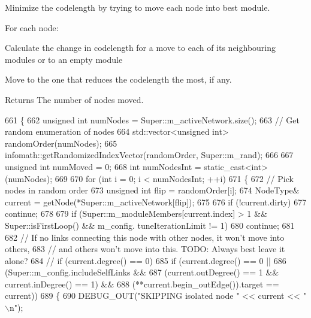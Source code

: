 Minimize the codelength by trying to move each node into best module.

For each node\+:
\begin{DoxyEnumerate}
\item Calculate the change in codelength for a move to each of its neighbouring modules or to an empty module
\item Move to the one that reduces the codelength the most, if any.
\end{DoxyEnumerate}

\begin{DoxyReturn}{Returns}
The number of nodes moved. 
\end{DoxyReturn}

\begin{DoxyCode}
661 \{
662     \textcolor{keywordtype}{unsigned} \textcolor{keywordtype}{int} numNodes = Super::m\_activeNetwork.size();
663     \textcolor{comment}{// Get random enumeration of nodes}
664     std::vector<unsigned int> randomOrder(numNodes);
665     infomath::getRandomizedIndexVector(randomOrder, Super::m\_rand);
666 
667     \textcolor{keywordtype}{unsigned} \textcolor{keywordtype}{int} numMoved = 0;
668     \textcolor{keywordtype}{int} numNodesInt = \textcolor{keyword}{static\_cast<}\textcolor{keywordtype}{int}\textcolor{keyword}{>}(numNodes);
669 
670     \textcolor{keywordflow}{for} (\textcolor{keywordtype}{int} i = 0; i < numNodesInt; ++i)
671     \{
672         \textcolor{comment}{// Pick nodes in random order}
673         \textcolor{keywordtype}{unsigned} \textcolor{keywordtype}{int} flip = randomOrder[i];
674         NodeType& current = getNode(*Super::m\_activeNetwork[flip]);
675 
676         \textcolor{keywordflow}{if} (!current.dirty)
677             \textcolor{keywordflow}{continue};
678 
679         \textcolor{keywordflow}{if} (Super::m\_moduleMembers[current.index] > 1 && Super::isFirstLoop() && m\_config.
      tuneIterationLimit != 1)
680             \textcolor{keywordflow}{continue};
681 
682         \textcolor{comment}{// If no links connecting this node with other nodes, it won't move into others,}
683         \textcolor{comment}{// and others won't move into this. TODO: Always best leave it alone?}
684 \textcolor{comment}{//      if (current.degree() == 0)}
685         \textcolor{keywordflow}{if} (current.degree() == 0 ||
686             (Super::m\_config.includeSelfLinks &&
687             (current.outDegree() == 1 && current.inDegree() == 1) &&
688             (**current.begin\_outEdge()).target == current))
689         \{
690             DEBUG\_OUT(\textcolor{stringliteral}{"SKIPPING isolated node "} << current << \textcolor{stringliteral}{"\(\backslash\)n"});

\end{DoxyCode}
